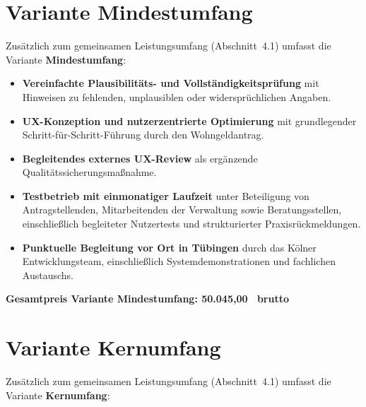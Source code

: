 \section{Variante Mindestumfang}

Zusätzlich zum gemeinsamen Leistungsumfang (Abschnitt~4.1) umfasst die Variante \textbf{Mindestumfang}:

\begin{itemize}
  \item \textbf{Vereinfachte Plausibilitäts- und Vollständigkeitsprüfung} mit Hinweisen zu fehlenden, unplausiblen oder widersprüchlichen Angaben.
  \item \textbf{UX-Konzeption und nutzerzentrierte Optimierung} mit grundlegender Schritt-für-Schritt-Führung durch den Wohngeldantrag.
  \item \textbf{Begleitendes externes UX-Review} als ergänzende Qualitätssicherungsmaßnahme.
  \item \textbf{Testbetrieb mit einmonatiger Laufzeit} unter Beteiligung von Antragstellenden, Mitarbeitenden der Verwaltung sowie Beratungsstellen, einschließlich begleiteter Nutzertests und strukturierter Praxisrückmeldungen.
  \item \textbf{Punktuelle Begleitung vor Ort in Tübingen} durch das Kölner Entwicklungsteam, einschließlich Systemdemonstrationen und fachlichen Austauschs.
\end{itemize}

\medskip
\noindent\textbf{Gesamtpreis Variante Mindestumfang: 50.045{,}00~\texteuro{} brutto}

\section{Variante Kernumfang}

Zusätzlich zum gemeinsamen Leistungsumfang (Abschnitt~4.1) umfasst die Variante \textbf{Kernumfang}:

